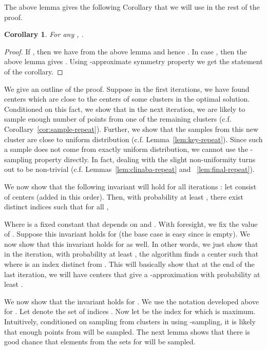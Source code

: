 \documentclass[a4paper]{article}
\newtheorem{corollary}[theorem]{Corollary}
\begin{document}
The above lemma gives the following Corollary that we will use in the rest of the proof.

\begin{corollary}\label{lem:min-repeat}
For any , .
\end{corollary}
\begin{proof}
If , then we have  from the above lemma and hence . In case , then the above lemma gives . Using -approximate symmetry property we get the statement of the corollary.
\end{proof}

We give an outline of the proof. Suppose in the first  iterations, we have found centers which are close to the centers of some  clusters in the optimal solution. Conditioned on this fact, we show that in the next iteration, we are likely to sample enough number of points from one of the remaining clusters (c.f. Corollary~\ref{cor:sample-repeat}). Further, we show that the samples from this new cluster are close to uniform distribution (c.f. Lemma~\ref{lem:key-repeat}). Since such a sample does not come from exactly uniform distribution, we cannot use the -sampling property directly. 
In fact, dealing with the slight non-uniformity turns out to be non-trivial (c.f. Lemmas~\ref{lem:clinaba-repeat} and ~\ref{lem:final-repeat}). 

We now show that the following invariant will hold for all iterations  : let  consist of centers
 (added in this order). Then, with probability at least , there exist distinct
indices  such that
for all ,

Where  is a fixed constant that depends on  and . With foresight, we fix the value of .
Suppose this invariant holds for  (the base case is easy since  is empty).
We now show that this invariant holds for  as well. In other words, we just show that in the  iteration,
with probability at least ,  the
algorithm finds a center   such that
 where  is an index distinct from
.
This will basically show that at the end of the last iteration, we will have  centers that give a -approximation
with probability at least .


We now show that the invariant holds for . We use the notation developed above for . Let  denote
the set of indices . Now let  be the index  for which 
is maximum. Intuitively, conditioned on sampling from clusters in  using -sampling, it is  likely that
enough points from  will be sampled.
The next lemma shows that there is good chance that elements from the sets  for 
will be sampled.
\end{document}
